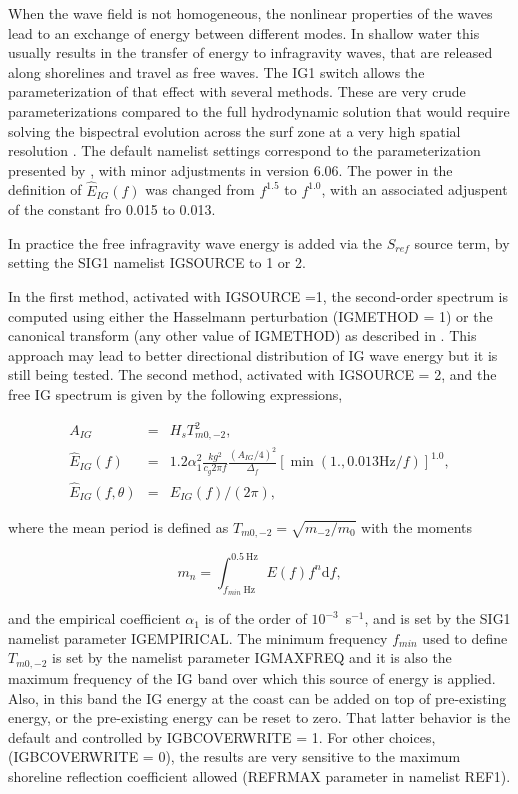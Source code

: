 When the wave field is not homogeneous, the nonlinear properties of the waves
lead to an exchange of energy between different modes. In shallow water this
usually results in the transfer of energy to infragravity waves, that are
released along shorelines and travel as free waves. The {\code IG1} switch
allows the parameterization of that effect with several methods.  These are
very crude parameterizations compared to the full hydrodynamic solution that
would require solving the bispectral evolution across the surf zone at a very
high spatial resolution \citep[e.g.][]{art:HB97}. The default namelist settings
correspond to the parameterization presented by \cite{art:Aea14}, with minor adjustments in version 6.06. 
The power in the definition of $\widehat{E}_{IG}(f)$ was changed from $f^{1.5}$ to $f^{1.0}$, with 
an associated adjuspent of the constant fro 0.015 to 0.013. 

 In practice the free infragravity wave energy is
added via the $S_{ref}$ source term, by setting the {\code SIG1} namelist
{\code IGSOURCE} to 1 or 2.

In the first method, activated with {\code IGSOURCE =1}, the second-order
spectrum is computed using either the Hasselmann perturbation ({\code IGMETHOD
= 1}) or the canonical transform (any other value of {\code IGMETHOD}) as described 
in \cite{art:Jan09}. This
approach may lead to better directional distribution of IG wave energy but it
is still being tested.  The second method, activated with {\code IGSOURCE =
2}, and the free IG spectrum is given by the following expressions,

\begin{eqnarray}
 A_{IG} & =&    H_s T_{m0,-2}^2\label{eq:IGfit0}, \\
\widehat{E}_{IG}(f)& = & 1.2 \alpha_1^2 \frac{k g^2}{c_g 2 \pi f} \frac{(A_{IG}/4)^2}{\Delta_f}  
\left[\min( 1., 0.013\mathrm{Hz}/ f)\right]^{1.0}, \label{eq:IGfit1} \\
 \widehat{E}_{IG}(f,\theta) & = & \widehat{E}_{IG}(f) / (2 \pi ),
\label{eq:fit2} 
\end{eqnarray}

\noindent
where the mean period is defined as $ T_{m0,-2} =\sqrt{m_{-2}/m_{0}}$ with the
moments

\begin{equation}
 m_n= \int_{f_{min}~\mathrm{Hz}}^{0.5~\mathrm{Hz}} E(f) f^n {\mathrm d}f,\label{eq:mn}
\end{equation}

\noindent
and the empirical coefficient $\alpha_1$ is of the order of
$10^{-3}$~s$^{-1}$, and is set by the {\code SIG1} namelist parameter {\code
IGEMPIRICAL}. The minimum frequency $f_{min}$ used to define $ T_{m0,-2}$ is
set by the namelist parameter {\code IGMAXFREQ} and it is also the maximum
frequency of the IG band over which this source of energy is applied.  Also,
in this band the IG energy at the coast can be added on top of pre-existing
energy, or the pre-existing energy can be reset to zero. That latter behavior
is the default and controlled by {\code IGBCOVERWRITE = 1}. For other choices,
({\code IGBCOVERWRITE = 0}), the results are very sensitive to the maximum
shoreline reflection coefficient allowed ({\code REFRMAX} parameter in
namelist {\F REF1}).

